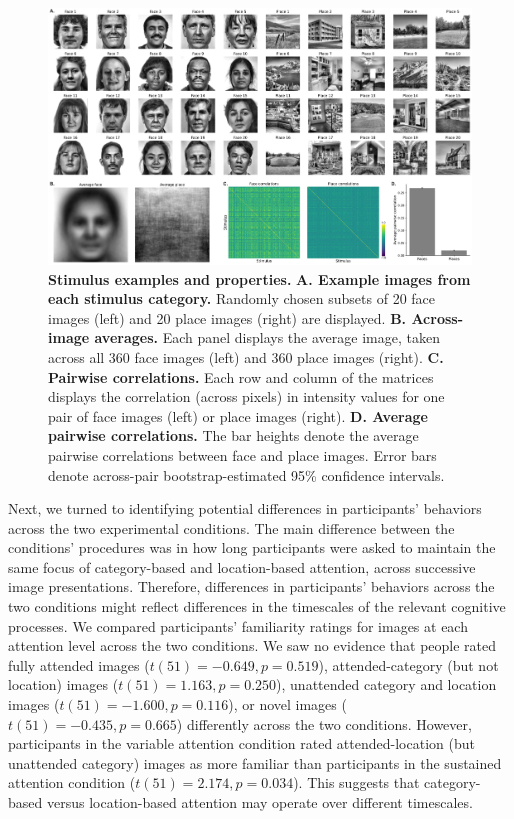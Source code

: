 \documentclass[english]{article}
\begin{document}
\begin{figure}[tp]
	\centering
	\includegraphics[width=\textwidth]{figs/stimuli}
  
  \caption{\textbf{Stimulus examples and properties.} \textbf{A. Example images
  from each stimulus category.} Randomly chosen subsets of 20 face images
  (left) and 20 place images (right) are displayed. \textbf{B. Across-image
  averages.} Each panel displays the average image, taken across all 360 face
  images (left) and 360 place images (right). \textbf{C. Pairwise
  correlations.} Each row and column of the matrices displays the correlation
  (across pixels) in intensity values for one pair of face images (left) or
  place images (right). \textbf{D. Average pairwise correlations.} The bar
  heights denote the average pairwise correlations between face and place
  images. Error bars denote across-pair bootstrap-estimated 95\%
  confidence intervals.}
  
  \label{fig:stimuli}
  \end{figure}

Next, we turned to identifying potential differences in participants' behaviors
across the two experimental conditions. The main difference between the
conditions' procedures was in how long participants were asked to maintain the
same focus of category-based and location-based attention, across successive
image presentations. Therefore, differences in participants' behaviors across
the two conditions might reflect differences in the timescales of the relevant
cognitive processes. We compared participants' familiarity ratings for images
at each attention level across the two conditions. We saw no evidence that
people rated fully attended images ($t(51) = -0.649, p = 0.519$),
attended-category (but not location) images ($t(51) = 1.163, p = 0.250$),
unattended category and location images ($t(51) = -1.600, p = 0.116$), or novel
images ($t(51) = -0.435, p = 0.665$) differently across the two conditions.
However, participants in the variable attention condition rated
attended-location (but unattended category) images as more familiar than
participants in the sustained attention condition ($t(51) = 2.174, p = 0.034$).
This suggests that category-based versus location-based attention may operate
over different timescales.
\end{document}
